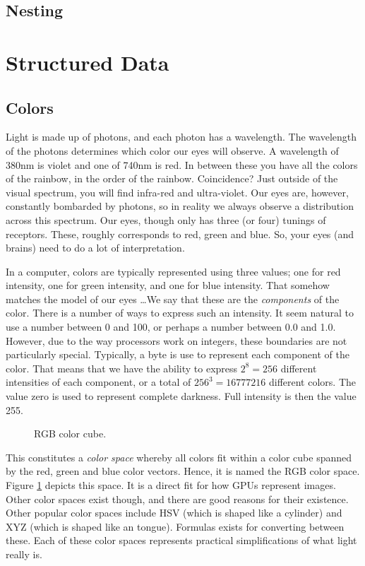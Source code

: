 \subsection{Nesting}

\section{Structured Data}

\subsection{Colors}

Light is made up of photons, and each photon has a wavelength. The wavelength of the photons determines which color our eyes will observe. A wavelength of 380nm is violet and one of 740nm is red. In between these you have all the colors of the rainbow, in the order of the rainbow. Coincidence? Just outside of the visual spectrum, you will find infra-red and ultra-violet. Our eyes are, however, constantly bombarded by photons, so in reality we always observe a distribution across this spectrum. Our eyes, though only has three (or four) tunings of receptors. These, roughly corresponds to red, green and blue. So, your eyes (and brains) need to do a lot of interpretation.

In a computer, colors are typically represented using three values; one for red intensity, one for green intensity, and one for blue intensity. That somehow matches the model of our eyes \ldots We say that these are the \textsl{components} of the color. There is a number of ways to express such an intensity. It seem natural to use a number between 0 and 100, or perhaps a number between 0.0 and 1.0. However, due to the way processors work on integers, these boundaries are not particularly special. Typically, a byte is use to represent each component of the color. That means that we have the ability to express $2^8=256$ different intensities of each component, or a total of $256^3=16777216$ different colors. The value zero is used to represent complete darkness. Full intensity is then the value 255.

\begin{figure}[tbp]
  
  \caption{RGB color cube.}
  \label{fig:primdata:struct:color}
\end{figure}

This constitutes a \textsl{color space} whereby all colors fit within a color cube spanned by the red, green and blue color vectors. Hence, it is named the RGB color space. Figure \ref{fig:primdata:struct:color} depicts this space. It is a direct fit for how GPUs represent images. Other color spaces exist though, and there are good reasons for their existence. Other popular color spaces include HSV (which is shaped like a cylinder) and XYZ (which is shaped like an tongue). Formulas exists for converting between these. Each of these color spaces represents practical simplifications of what light really is.

